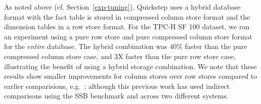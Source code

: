 As noted above (cf. Section~\ref{exp-tuning}), Quickstep uses a hybrid database format with the fact table is stored in compressed column store format and the dimension tables in a row store format. For the TPC-H SF 100 dataset, we ran an experiment using a pure row store and pure compressed column store format for the \textit{entire} database. The hybrid combination was 40\% faster than the pure compressed column store case, and 3X faster than the pure row store case, illustrating the benefit of using a hybrid storage combination. We note that these results show smaller improvements for column stores over row stores compared to earlier comparisions, e.g.~\cite{AbadiMH08}; although this previous work has used indirect comparisons using the SSB benchmark and across two different systems.


%





